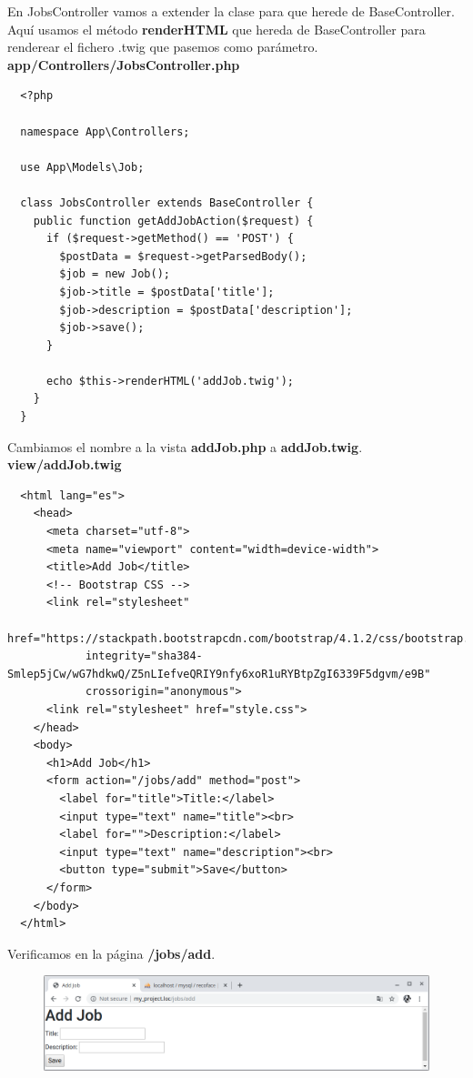 \documentclass{article}
\begin{document}
En JobsController vamos a extender la clase para que herede de BaseController.
Aquí usamos el método \textbf{renderHTML} que hereda de BaseController para
renderear el fichero .twig que pasemos como parámetro.\\

\textbf{app/Controllers/JobsController.php}
\begin{verbatim}
  <?php

  namespace App\Controllers;

  use App\Models\Job;

  class JobsController extends BaseController {
    public function getAddJobAction($request) {
      if ($request->getMethod() == 'POST') {
        $postData = $request->getParsedBody();
        $job = new Job();
        $job->title = $postData['title'];
        $job->description = $postData['description'];
        $job->save();
      }

      echo $this->renderHTML('addJob.twig');
    }
  }
\end{verbatim}

Cambiamos el nombre a la vista \textbf{addJob.php} a \textbf{addJob.twig}.\\

\textbf{view/addJob.twig}
\begin{verbatim}
  <html lang="es">
    <head>
      <meta charset="utf-8">
      <meta name="viewport" content="width=device-width">
      <title>Add Job</title>
      <!-- Bootstrap CSS -->
      <link rel="stylesheet"
            href="https://stackpath.bootstrapcdn.com/bootstrap/4.1.2/css/bootstrap.min.css"
            integrity="sha384-Smlep5jCw/wG7hdkwQ/Z5nLIefveQRIY9nfy6xoR1uRYBtpZgI6339F5dgvm/e9B"
            crossorigin="anonymous">
      <link rel="stylesheet" href="style.css">
    </head>
    <body>
      <h1>Add Job</h1>
      <form action="/jobs/add" method="post">
        <label for="title">Title:</label>
        <input type="text" name="title"><br>
        <label for="">Description:</label>
        <input type="text" name="description"><br>
        <button type="submit">Save</button>
      </form>
    </body>
  </html>
\end{verbatim}

Verificamos en la página \textbf{/jobs/add}.\\

\begin{figure}[h!]
  \centering
  \includegraphics[scale=0.5]{./Pictures/155_twig_jobsadd_ok.png}
\end{figure}
\end{document}
